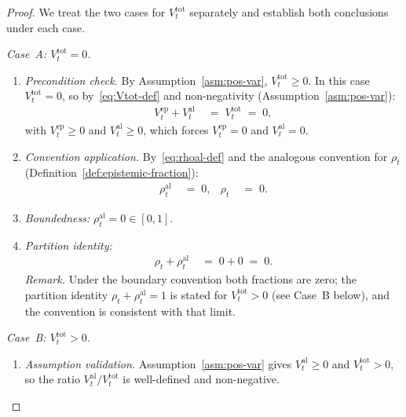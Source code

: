 \documentclass[12pt,openany]{book}
\numberwithin{equation}{chapter}
\theoremstyle{plain}
\theoremstyle{definition}
\theoremstyle{remark}
\numberwithin{equation}{chapter}
\theoremstyle{plain}
\begin{document}
\begin{proof}
We treat the two cases for $V^{\mathrm{tot}}_t$ separately and
establish both conclusions under each case.

\medskip
\noindent\emph{Case~A: $V^{\mathrm{tot}}_t = 0$.}

\begin{enumerate}
  \item \emph{Precondition check.}
        By Assumption~\ref{asm:pos-var}, $V^{\mathrm{tot}}_t \geq 0$.
        In this case $V^{\mathrm{tot}}_t = 0$, so
        by~\eqref{eq:Vtot-def} and non-negativity
        (Assumption~\ref{asm:pos-var}):
        \begin{align}
          V^{\mathrm{ep}}_t + V^{\mathrm{al}}_t
          &\;=\; V^{\mathrm{tot}}_t \;=\; 0,
          \label{eq:caseA-sum}
        \end{align}
        with $V^{\mathrm{ep}}_t \geq 0$ and $V^{\mathrm{al}}_t \geq 0$,
        which forces $V^{\mathrm{ep}}_t = 0$ and $V^{\mathrm{al}}_t = 0$.

  \item \emph{Convention application.}
        By~\eqref{eq:rhoal-def} and the analogous convention for
        $\rho_t$ (Definition~\ref{def:epistemic-fraction}):
        \begin{align}
          \rho^{\mathrm{al}}_t &\;=\; 0,
          &
          \rho_t &\;=\; 0.
          \label{eq:caseA-vals}
        \end{align}

  \item \emph{Boundedness:}
        $\rho^{\mathrm{al}}_t = 0 \in [0, 1]$. \checkmark

  \item \emph{Partition identity:}
        \begin{align}
          \rho_t + \rho^{\mathrm{al}}_t
          &\;=\; 0 + 0 \;=\; 0.
          \label{eq:caseA-partition}
        \end{align}
        \emph{Remark.}  Under the boundary convention both fractions
        are zero; the partition identity $\rho_t + \rho^{\mathrm{al}}_t = 1$
        is stated for $V^{\mathrm{tot}}_t > 0$ (see Case~B below),
        and the convention is consistent with that limit. \checkmark
\end{enumerate}

\medskip
\noindent\emph{Case~B: $V^{\mathrm{tot}}_t > 0$.}

\begin{enumerate}
  \item \emph{Assumption validation.}
        Assumption~\ref{asm:pos-var} gives
        $V^{\mathrm{al}}_t \geq 0$ and
        $V^{\mathrm{tot}}_t > 0$, so the ratio
        $V^{\mathrm{al}}_t / V^{\mathrm{tot}}_t$ is well-defined
        and non-negative.


\end{enumerate}
\end{proof}
\end{document}
